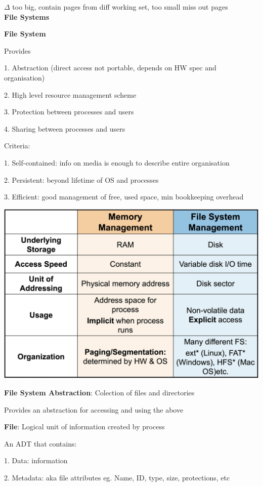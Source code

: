 \documentclass[10pt, a4paper]{article}
\newcommand{\blue}[1]{{\color{MidnightBlue}#1}}
\newcommand{\header}[1]{{\normalsize\textbf{#1}}}
\begin{document}
\begin{multicols*}{3}
		$\Delta$ too big, contain pages from diff working set, too small miss out pages\\

		\header{File Systems}

		\textbf{File System}

		Provides 
		
		1. \blue{Abstraction} (direct access not portable, depends on HW spec and organisation)

		2. High level \blue{resource management scheme}

		3. \blue{Protection} between processes and users

		4. \blue{Sharing} between processes and users

		Criteria:

		1. \blue{Self-contained}: info on media is enough to describe entire organisation

		2. \blue{Persistent}: beyond lifetime of OS and processes

		3. \blue{Efficient}: good management of free, used space, min bookkeeping overhead

		\includegraphics*[scale=.2]{./assets/memvsFile}

		\textbf{File System Abstraction}: Colection of files and directories

		Provides an abstraction for accessing and using the above

		\textbf{File}: Logical unit of information created by process

		An \blue{ADT} that contains:

		1. Data: information

		2. Metadata: aka file attributes eg. Name, ID, type, size, protections, etc


\end{multicols*}
\end{document}
